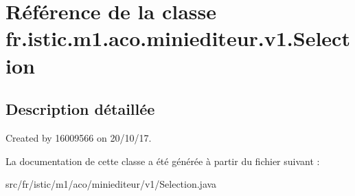 \hypertarget{classfr_1_1istic_1_1m1_1_1aco_1_1miniediteur_1_1v1_1_1Selection}{}\section{Référence de la classe fr.\+istic.\+m1.\+aco.\+miniediteur.\+v1.\+Selection}
\label{classfr_1_1istic_1_1m1_1_1aco_1_1miniediteur_1_1v1_1_1Selection}


\subsection{Description détaillée}
Created by 16009566 on 20/10/17. 

La documentation de cette classe a été générée à partir du fichier suivant \+:\begin{DoxyCompactItemize}
\item 
src/fr/istic/m1/aco/miniediteur/v1/Selection.\+java\end{DoxyCompactItemize}
